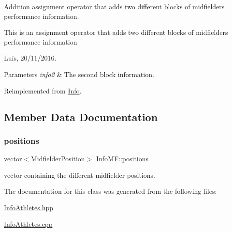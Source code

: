 Addition assignment operator that adds two different blocks of midfielder\textquotesingle{}s performance information. 

This is an assignment operator that adds two different blocks of midfielder\textquotesingle{}s performance information

Luís, 20/11/2016. 


\begin{DoxyParams}{Parameters}
{\em info2} & The second block information. \\
\hline
\end{DoxyParams}


Reimplemented from \hyperlink{class_info_a35d820d35f8ab3b8de15cdfc07f0c5a4}{Info}.



\subsection{Member Data Documentation}
\hypertarget{class_info_m_f_ac0ef77d22b8f5c008b8f66034ad0bd81}{}\label{class_info_m_f_ac0ef77d22b8f5c008b8f66034ad0bd81} 
\subsubsection{\texorpdfstring{positions}{positions}}
{\footnotesize\ttfamily vector$<$\hyperlink{_utils_8hpp_a9f9328fe291d23e820ad594679abd217}{Midfielder\+Position}$>$ Info\+M\+F\+::positions\hspace{0.3cm}{\ttfamily [protected]}}



vector containing the different midfielder positions. 



The documentation for this class was generated from the following files\+:\begin{DoxyCompactItemize}
\item 
\hyperlink{_info_athletes_8hpp}{Info\+Athletes.\+hpp}\item 
\hyperlink{_info_athletes_8cpp}{Info\+Athletes.\+cpp}\end{DoxyCompactItemize}

